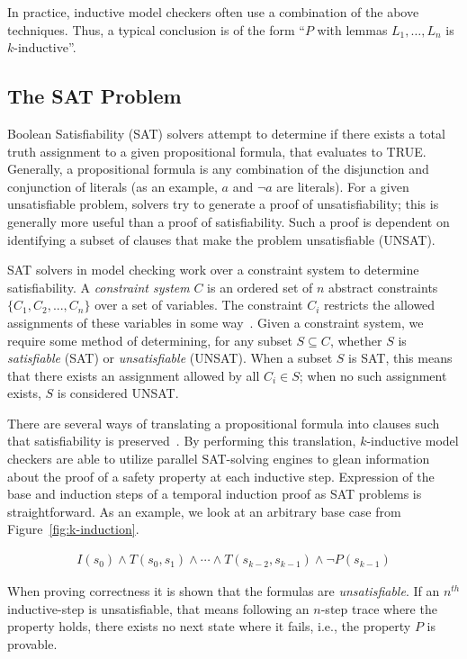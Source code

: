 In practice, inductive model checkers often use a combination of the
above techniques. Thus, a typical conclusion is of the form ``$P$ with
lemmas $L_1, \ldots, L_n$ is $k$-inductive''.

\subsection{The SAT Problem}
Boolean Satisfiability (SAT) solvers attempt to determine if there exists a total truth assignment to a given propositional formula, that evaluates to TRUE. Generally, a propositional formula is any combination of the disjunction and conjunction of literals (as an example, $a$ and $\neg a$ are literals). For a given unsatisfiable problem, solvers try to generate a proof of unsatisfiability; this is generally more useful than a proof of satisfiability. Such a proof is dependent on identifying a subset of clauses that make the problem unsatisfiable (UNSAT). 

SAT solvers in model checking work over a constraint system to determine satisfiability. A \textit{constraint system} $C$ is an ordered set of $n$ abstract constraints $\{C_1, C_2, ..., C_n\}$ over a set of variables. The constraint $C_i$ restricts the allowed assignments of these variables in some way~\cite{liffiton2016fast}. Given a constraint system, we require some method of determining, for any subset $S \subseteq C$, whether $S$ is \textit{satisfiable} (SAT) or \textit{unsatisfiable} (UNSAT). When a subset $S$ is SAT, this means that there exists an assignment allowed by all $C_i \in S$; when no such assignment exists, $S$ is considered UNSAT. 

There are several ways of translating a propositional formula into clauses such that satisfiability is preserved~\cite{een2003temporal}. By performing this translation, $k$-inductive model checkers are able to utilize parallel SAT-solving engines to glean information about the proof of a safety property at each inductive step. Expression of the base and induction steps of a temporal induction proof as SAT problems is straightforward. As an example, we look at an arbitrary base case from Figure~\ref{fig:k-induction}.

\begin{gather*}
I(s_0) \land T(s_0, s_1) \land \cdots \land T(s_{k-2}, s_{k-1})
\land \neg P(s_{k-1})
\end{gather*}

When proving correctness it is shown that the formulas are \emph{unsatisfiable}. If an $n^{th}$ inductive-step is unsatisfiable, that means following an $n$-step trace where the property holds, there exists no next state where it fails, i.e., the property $P$ is provable.

